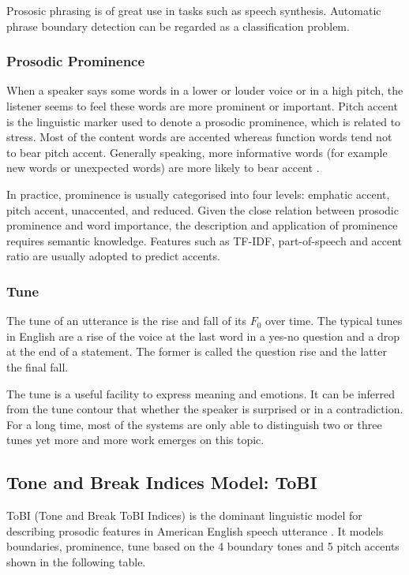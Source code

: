 Prososic phrasing is of great use in tasks such as speech synthesis. Automatic phrase boundary detection can be regarded as a classification problem. 

\subsubsection{Prosodic Prominence}
When a speaker says some words in a lower or louder voice or in a high pitch, the listener seems to feel these words are more prominent or important. Pitch accent is the linguistic marker used to denote a prosodic prominence, which is related to stress. Most of the content words are accented whereas function words tend not to bear pitch accent. Generally speaking, more informative words (for example new words or unexpected words) are more likely to bear accent \citep{Jurafsky2008, Ladd2008}.

In practice, prominence is usually categorised into four levels: emphatic accent, pitch accent, unaccented, and reduced. Given the close relation between prosodic prominence and word importance, the description and application of prominence requires semantic knowledge. Features such as TF-IDF, part-of-speech and accent ratio are usually adopted to predict accents.

\subsubsection{Tune}
The tune of an utterance is the rise and fall of its $F_0$ over time. The typical tunes in English are a rise of the voice at the last word in a yes-no question and a drop at the end of a statement. The former is called the question rise and the latter the final fall. 

The tune is a useful facility to express meaning and emotions. It can be inferred from the tune contour that whether the speaker is surprised or in a contradiction. For a long time, most of the systems are only able to distinguish two or three tunes yet more and more work emerges on this topic.

\subsection{Tone and Break Indices Model: ToBI}
ToBI (Tone and Break ToBI Indices) is the dominant linguistic model for describing prosodic features in American English speech utterance \citep{Silverman1992, Pitrelli1994}. It models boundaries, prominence, tune based on the 4 boundary tones and 5 pitch accents shown in the following table.

